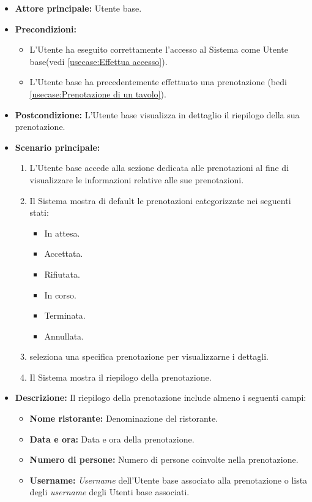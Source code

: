 \label{usecase:Visualizzazione del riepilogo prenotazione}
\begin{itemize}
	\item \textbf{Attore principale:} Utente base.

	\item \textbf{Precondizioni:}
	\begin{itemize}
		\item L'Utente ha eseguito correttamente l'accesso al Sistema come Utente base(vedi \autoref{usecase:Effettua accesso}).
		\item L'Utente base ha precedentemente effettuato una prenotazione (bedi \autoref{usecase:Prenotazione di un tavolo}).
	\end{itemize}


	\item \textbf{Postcondizione:}
	      L'Utente base visualizza in dettaglio il riepilogo della sua prenotazione.

	\item \textbf{Scenario principale:}
	      \begin{enumerate}
		      \item L'Utente base accede alla sezione dedicata alle prenotazioni al fine di visualizzare le informazioni relative alle sue prenotazioni.
		      \item Il Sistema mostra di default le prenotazioni categorizzate nei seguenti stati:
		      \begin{itemize}
                \item In attesa.
                \item Accettata.
                \item Rifiutata.
                \item In corso.
                \item Terminata.
                \item Annullata.
              \end{itemize}
		      \item seleziona una specifica prenotazione per visualizzarne i dettagli.
		      \item Il Sistema mostra il riepilogo della prenotazione.
	      \end{enumerate}

	\item \textbf{Descrizione:}
		Il riepilogo della prenotazione include almeno i seguenti campi:
	      \begin{itemize}
		      \item \textbf{Nome ristorante:} Denominazione del ristorante.
		      \item \textbf{Data e ora:} Data e ora della prenotazione.
		      \item \textbf{Numero di persone:} Numero di persone coinvolte nella prenotazione.
		      \item \textbf{Username:} \textit{Username} dell'Utente base associato alla prenotazione o lista degli \textit{username} degli Utenti base associati.


\end{itemize}
\end{itemize}
